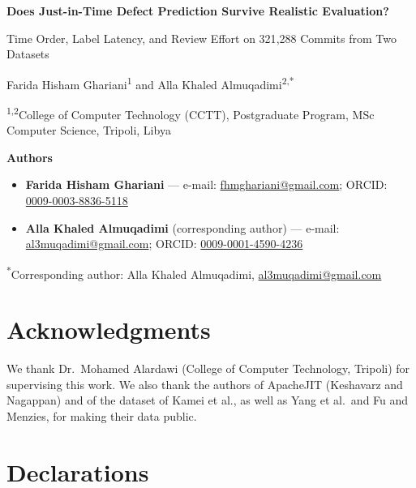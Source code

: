 \documentclass[11pt,a4paper]{article}
\begin{document}
\begin{center}
{\Large\bfseries Does Just-in-Time Defect Prediction Survive Realistic Evaluation?\par}
\vspace{0.4em}
{\large Time Order, Label Latency, and Review Effort on 321{,}288 Commits from Two Datasets\par}
\vspace{1.6em}

{\large Farida Hisham Ghariani\textsuperscript{1} \quad and \quad Alla Khaled Almuqadimi\textsuperscript{2,*}\par}
\vspace{1em}

\textsuperscript{1,2}College of Computer Technology (CCTT), Postgraduate Program, MSc Computer Science, Tripoli, Libya
\end{center}

\vspace{1em}
\noindent\textbf{Authors}

\begin{itemize}
\item \textbf{Farida Hisham Ghariani} --- e-mail: \href{mailto:fhmghariani@gmail.com}{fhmghariani@gmail.com};
      ORCID: \href{https://orcid.org/0009-0003-8836-5118}{0009-0003-8836-5118}
\item \textbf{Alla Khaled Almuqadimi} (corresponding author) --- e-mail: \href{mailto:al3muqadimi@gmail.com}{al3muqadimi@gmail.com};
      ORCID: \href{https://orcid.org/0009-0001-4590-4236}{0009-0001-4590-4236}
\end{itemize}

\noindent\textsuperscript{*}Corresponding author: Alla Khaled Almuqadimi, \href{mailto:al3muqadimi@gmail.com}{al3muqadimi@gmail.com}

\section*{Acknowledgments}

\noindent We thank Dr.\ Mohamed Alardawi (College of Computer Technology, Tripoli) for supervising this work. We also thank the authors of ApacheJIT (Keshavarz and Nagappan) and of the dataset of Kamei et al., as well as Yang et al.\ and Fu and Menzies, for making their data public.

\section*{Declarations}
\end{document}
